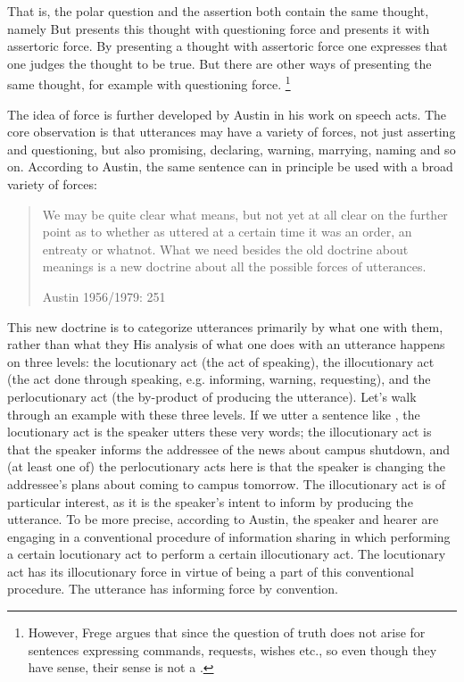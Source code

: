 That is, the polar question  and the assertion  both contain the same thought, namely   But  presents this thought with questioning force and  presents it with assertoric force. By presenting a thought with assertoric force one expresses that one judges the thought to be true. But there are other ways of presenting the same thought, for example with questioning force. \footnote{However, Frege argues that since the question of truth does not arise for sentences expressing commands, requests, wishes etc., so even though they have sense, their sense is not a .}

The idea of force is further developed by Austin in his work on speech acts. The core observation is that utterances may have a variety of forces, not just asserting and questioning, but also promising, declaring, warning, marrying, naming and so on. According to Austin, the same sentence can in principle be used with a broad variety of forces:

\begin{quote}
    
We may be quite clear what  means, but not yet at all clear on the further point as to whether as uttered at a certain time it was an order, an entreaty or whatnot. What we need besides the old doctrine about meanings is a new doctrine about all the possible forces of utterances.

\hfill Austin 1956/1979: 251
\end{quote}

This new doctrine is to categorize utterances primarily by what one  with them, rather than what they  His analysis of what one does with an utterance happens on three levels: the locutionary act (the act of speaking), the illocutionary act (the act done through speaking, e.g. informing, warning, requesting), and the perlocutionary act (the by-product of producing the utterance). Let’s walk through an example with these three levels. If we utter a sentence like , the locutionary act is the speaker utters these very words; the illocutionary act is that the speaker informs the addressee of the news about campus shutdown, and (at least one of) the perlocutionary acts here is that the speaker is changing the addressee’s plans about coming to campus tomorrow. The illocutionary act is of particular interest, as it is the speaker’s intent to inform by producing the utterance. To be more precise, according to Austin, the speaker and hearer are engaging in a conventional procedure of information sharing in which performing a certain locutionary act  to perform a certain illocutionary act. The locutionary act has its illocutionary force in virtue of being a part of this conventional procedure. The utterance has informing force by convention.

